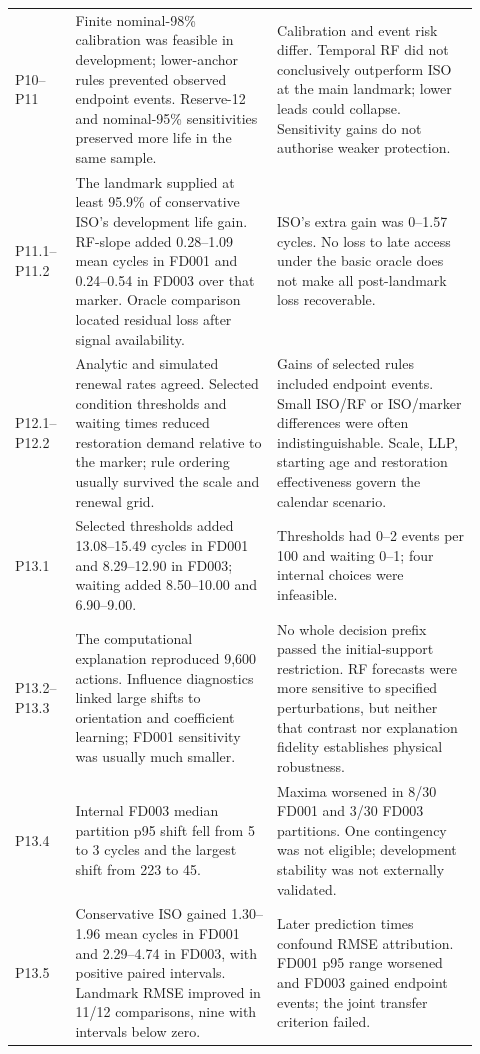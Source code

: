 \documentclass[12pt]{article}
\begin{document}
\begin{longtable}{@{}p{0.12\linewidth}p{0.40\linewidth}p{0.40\linewidth}@{}}
P10--P11 & Finite nominal-98\% calibration was feasible in development; lower-anchor rules prevented observed endpoint events. Reserve-12 and nominal-95\% sensitivities preserved more life in the same sample. & Calibration and event risk differ. Temporal RF did not conclusively outperform ISO at the main landmark; lower leads could collapse. Sensitivity gains do not authorise weaker protection. \\
P11.1--P11.2 & The landmark supplied at least 95.9\% of conservative ISO's development life gain. RF-slope added 0.28--1.09 mean cycles in FD001 and 0.24--0.54 in FD003 over that marker. Oracle comparison located residual loss after signal availability. & ISO's extra gain was 0--1.57 cycles. No loss to late access under the basic oracle does not make all post-landmark loss recoverable. \\
P12.1--P12.2 & Analytic and simulated renewal rates agreed. Selected condition thresholds and waiting times reduced restoration demand relative to the marker; rule ordering usually survived the scale and renewal grid. & Gains of selected rules included endpoint events. Small ISO/RF or ISO/marker differences were often indistinguishable. Scale, LLP, starting age and restoration effectiveness govern the calendar scenario. \\
P13.1 & Selected thresholds added 13.08--15.49 cycles in FD001 and 8.29--12.90 in FD003; waiting added 8.50--10.00 and 6.90--9.00. & Thresholds had 0--2 events per 100 and waiting 0--1; four internal choices were infeasible. \\
P13.2--P13.3 & The computational explanation reproduced 9,600 actions. Influence diagnostics linked large shifts to orientation and coefficient learning; FD001 sensitivity was usually much smaller. & No whole decision prefix passed the initial-support restriction. RF forecasts were more sensitive to specified perturbations, but neither that contrast nor explanation fidelity establishes physical robustness. \\
P13.4 & Internal FD003 median partition p95 shift fell from 5 to 3 cycles and the largest shift from 223 to 45. & Maxima worsened in 8/30 FD001 and 3/30 FD003 partitions. One contingency was not eligible; development stability was not externally validated. \\
P13.5 & Conservative ISO gained 1.30--1.96 mean cycles in FD001 and 2.29--4.74 in FD003, with positive paired intervals. Landmark RMSE improved in 11/12 comparisons, nine with intervals below zero. & Later prediction times confound RMSE attribution. FD001 p95 range worsened and FD003 gained endpoint events; the joint transfer criterion failed. \\

\end{longtable}
\end{document}
